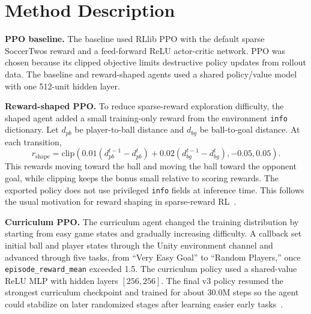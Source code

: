 \documentclass{article}
\begin{document}

\section{Method Description}

\textbf{PPO baseline.}
The baseline used RLlib PPO with the default sparse SoccerTwos reward and a feed-forward ReLU actor-critic network. PPO was chosen because its clipped objective limits destructive policy updates from rollout data. The baseline and reward-shaped agents used a shared policy/value model with one 512-unit hidden layer.

\textbf{Reward-shaped PPO.}
To reduce sparse-reward exploration difficulty, the shaped agent added a small training-only reward from the environment \texttt{info} dictionary. Let $d_{pb}$ be player-to-ball distance and $d_{bg}$ be ball-to-goal distance. At each transition,
\[
  r_{\mathrm{shape}} =
  \mathrm{clip}\left(0.01(d_{pb}^{t-1}-d_{pb}^{t}) +
  0.02(d_{bg}^{t-1}-d_{bg}^{t}), -0.05, 0.05\right).
\]
This rewards moving toward the ball and moving the ball toward the opponent
goal, while clipping keeps the bonus small relative to scoring rewards. The
exported policy does not use privileged \texttt{info} fields at inference time.
This follows the usual motivation for reward shaping in sparse-reward
RL~\citep{ng1999policy}.

\textbf{Curriculum PPO.}
The curriculum agent changed the training distribution by starting from easy game states and gradually increasing difficulty. A callback set initial ball and player states through the Unity environment channel and advanced through five tasks, from ``Very Easy Goal'' to ``Random Players,'' once \texttt{episode\_reward\_mean} exceeded 1.5. The curriculum policy used a shared-value ReLU MLP with hidden layers \([256,256]\). The final v3 policy resumed the strongest curriculum checkpoint and trained for about 30.0M steps so the agent could stabilize on later randomized stages after learning easier early tasks~\citep{bengio2009curriculum}.
\end{document}
